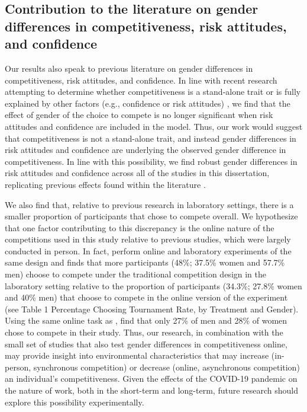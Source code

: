 \documentclass[letterpaper, nobind]{templates/ociamthesis}
\begin{document}
\hypertarget{contribution-to-the-literature-on-gender-differences-in-competitiveness-risk-attitudes-and-confidence}{%
\subsection{Contribution to the literature on gender differences in competitiveness, risk attitudes, and confidence}\label{contribution-to-the-literature-on-gender-differences-in-competitiveness-risk-attitudes-and-confidence}}

Our results also speak to previous literature on gender differences in competitiveness, risk attitudes, and confidence. In line with recent research attempting to determine whether competitiveness is a stand-alone trait or is fully explained by other factors (e.g., confidence or risk attitudes) \autocite{Gillen2019,Veldhuizen2017}, we find that the effect of gender of the choice to compete is no longer significant when risk attitudes and confidence are included in the model. Thus, our work would suggest that competitiveness is not a stand-alone trait, and instead gender differences in risk attitudes and confidence are underlying the observed gender difference in competitiveness. In line with this possibility, we find robust gender differences in risk attitudes and confidence across all of the studies in this dissertation, replicating previous effects found within the literature \autocite{Croson2009,Dohmen2011b,Eckel2008,Bertrand2010a,Bertrand2010,Lundeberg1994,Mobius2011,Barber2001}.

We also find that, relative to previous research in laboratory settings, there is a smaller proportion of participants that chose to compete overall. We hypothesize that one factor contributing to this discrepancy is the online nature of the competitions used in this study relative to previous studies, which were largely conducted in person. In fact, \textcite{Apicella2017a} perform online and laboratory experiments of the same design and finds that more participants (48\%; 37.5\% women and 57.7\% men) choose to compete under the traditional competition design in the laboratory setting relative to the proportion of participants (34.3\%; 27.8\% women and 40\% men) that choose to compete in the online version of the experiment (see Table 1 Percentage Choosing Tournament Rate, by Treatment and Gender). Using the same online task as \textcite{Apicella2017a}, \textcite{Charness2021} find that only 27\% of men and 28\% of women chose to compete in their study. Thus, our research, in combination with the small set of studies that also test gender differences in competitiveness online, may provide insight into environmental characteristics that may increase (in-person, synchronous competition) or decrease (online, asynchronous competition) an individual's competitiveness. Given the effects of the COVID-19 pandemic on the nature of work, both in the short-term and long-term, future research should explore this possibility experimentally.
\end{document}
